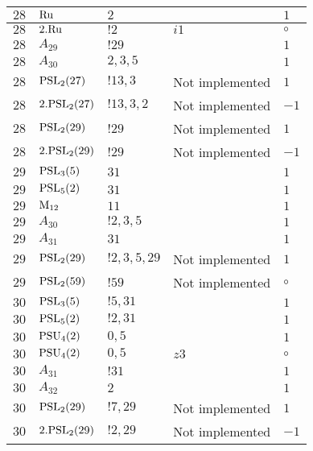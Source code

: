 \documentclass[a4paper, 11pt]{article}
\begin{document}
\begin{longtable}{lllll}
        $ 28 $ & $ {\rm Ru} $ & $ 2 $ & $ ~ $ & $ 1$ \\ \hline
        $ 28 $ & $ 2.{\rm Ru} $ & $ ! 2 $ & $ i1 $ &  $\circ$ \\ \hline
        $ 28 $ & $ A_{29} $ & $ !29 $ & $ ~ $ & $ 1$ \\ \hline
        $ 28 $ & $ A_{30} $ & $ 2, 3, 5 $ & $ ~ $ & $ 1$ \\ \hline
        $ 28 $ & $ {\rm PSL}_{2}(27) $ & $ !13, 3 $ &  Not implemented & $ 1$ \\ \hline
        $ 28 $ & $ 2.{\rm PSL}_{2}(27) $ & $ !13, 3, 2 $ &  Not implemented & $ -1$ \\ \hline
        $ 28 $ & $ {\rm PSL}_{2}(29) $ & $ !29 $ &  Not implemented & $ 1$ \\ \hline
        $ 28 $ & $ 2.{\rm PSL}_{2}(29) $ & $ !29 $ &  Not implemented & $ -1$ \\ \hline
        $ 29 $ & $ {\rm PSL}_{3}(5) $ & $ 31 $ & $ ~ $ & $ 1$ \\ \hline
        $ 29 $ & $ {\rm PSL}_{5}(2) $ & $ 31 $ & $ ~ $ & $ 1$ \\ \hline
        $ 29 $ & $ {\rm M}_{12} $ & $ 11 $ & $ ~ $ & $ 1$ \\ \hline
        $ 29 $ & $ A_{30} $ & $ !2, 3, 5 $ & $ ~ $ & $ 1$ \\ \hline
        $ 29 $ & $ A_{31} $ & $ 31 $ & $ ~ $ & $ 1$ \\ \hline
        $ 29 $ & $ {\rm PSL}_{2}(29) $ & $ !2, 3, 5, 29 $ &  Not implemented & $ 1$ \\ \hline
        $ 29 $ & $ {\rm PSL}_{2}(59) $ & $ !59 $ &  Not implemented &  $\circ$ \\ \hline
        $ 30 $ & $ {\rm PSL}_{3}(5) $ & $ ! 5,31 $ & $ ~ $ & $ 1$ \\ \hline
        $ 30 $ & $ {\rm PSL}_{5}(2) $ & $ ! 2,31 $ & $ ~ $ & $ 1$ \\ \hline
        $ 30 $ & $ {\rm PSU}_{4}(2) $ & $ 0,5 $ & $ ~ $ & $ 1$ \\ \hline
        $ 30 $ & $ {\rm PSU}_{4}(2) $ & $ 0,5 $ & $ z3 $ &  $\circ$ \\ \hline
        $ 30 $ & $ A_{31} $ & $ !31 $ & $ ~ $ & $ 1$ \\ \hline
        $ 30 $ & $ A_{32} $ & $ 2 $ & $ ~ $ & $ 1$ \\ \hline
        $ 30 $ & $ {\rm PSL}_{2}(29) $ & $ !7, 29 $ &  Not implemented & $ 1$ \\ \hline
        $ 30 $ & $ 2.{\rm PSL}_{2}(29) $ & $ !2, 29 $ &  Not implemented & $ -1$ \\ \hline

\end{longtable}
\end{document}
